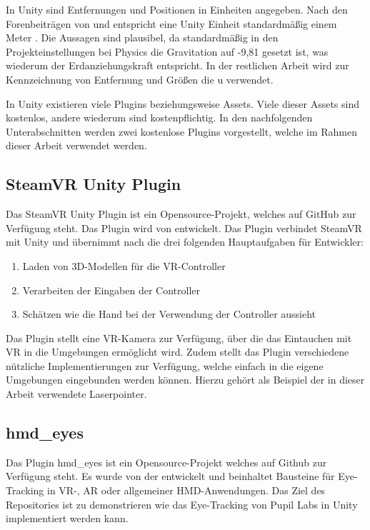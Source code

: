 In Unity sind Entfernungen und Positionen in Einheiten angegeben. Nach den Forenbeiträgen von \citeauthor{BrentAllard.2017} und \citeauthor{AVividLight.2010} entspricht eine Unity Einheit standardmäßig einem Meter \cite{BrentAllard.2017, AVividLight.2010}. Die Aussagen sind plausibel, da standardmäßig in den Projekteinstellungen bei Physics die Gravitation auf -9,81 gesetzt ist, was wiederum der Erdanziehungskraft entspricht. In der restlichen Arbeit wird zur Kennzeichnung von Entfernung und Größen die \ac{u} verwendet.

In Unity existieren viele Plugins beziehungsweise Assets. Viele dieser Assets sind kostenlos, andere wiederum sind kostenpflichtig. In den nachfolgenden Unterabschnitten werden zwei kostenlose Plugins vorgestellt, welche im Rahmen dieser Arbeit verwendet werden.

\subsection{SteamVR Unity Plugin}
Das SteamVR Unity Plugin ist ein Opensource-Projekt, welches auf GitHub zur Verfügung steht. Das Plugin wird von \citeauthor{ValveSW.2020} entwickelt. \cite{ValveSW.2020} Das Plugin verbindet SteamVR mit Unity und übernimmt nach \citeauthor{ValveSW.2019} die drei folgenden Hauptaufgaben für Entwickler: \cite{ValveSW.2019} 

\begin{enumerate}
	\item Laden von 3D-Modellen für die \ac{VR}-Controller
	\item Verarbeiten der Eingaben der Controller
	\item Schätzen wie die Hand bei der Verwendung der Controller aussieht
\end{enumerate}

Das Plugin stellt eine \ac{VR}-Kamera zur Verfügung, über die das Eintauchen mit \ac{VR} in die Umgebungen ermöglicht wird. Zudem stellt das Plugin verschiedene nützliche Implementierungen zur Verfügung, welche einfach in die eigene Umgebungen eingebunden werden können. Hierzu gehört als Beispiel der in dieser Arbeit verwendete Laserpointer. 

\subsection{hmd\_eyes}
Das Plugin hmd\_eyes ist ein Opensource-Projekt welches auf Github zur Verfügung steht. Es wurde von der \citeauthor{hmd-eyes.2020} entwickelt und beinhaltet Bausteine für Eye-Tracking in \ac{VR}-, \ac{AR} oder allgemeiner \ac{HMD}-Anwendungen. Das Ziel des Repositories ist zu demonstrieren wie das Eye-Tracking von Pupil Labs in Unity implementiert werden kann. \cite{hmd-eyes.2020} 

